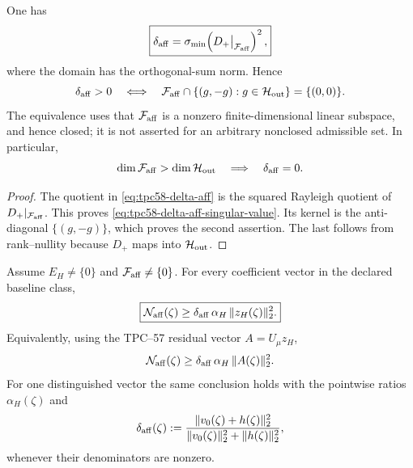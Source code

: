 \begin{proposition}
\label{prop:tpc58-affine-kernel-test}
One has
\begin{equation}
 \boxed{
 \delta_{\rm aff}
 =\sigma_{\min}\!\left(D_+\big|_{\mathcal F_{\rm aff}}\right)^2,}
 \label{eq:tpc58-delta-aff-singular-value}
\end{equation}
where the domain has the orthogonal-sum norm.  Hence
\begin{equation}
 \delta_{\rm aff}>0
 \quad\Longleftrightarrow\quad
 \mathcal F_{\rm aff}\cap
 \{(g,-g):g\in\mathcal H_{\rm out}\}=\{(0,0)\}.
 \label{eq:tpc58-delta-aff-kernel-test}
\end{equation}
The equivalence uses that \(\mathcal F_{\rm aff}\) is a nonzero finite-dimensional
linear subspace, and hence closed; it is not asserted for an arbitrary
nonclosed admissible set.
In particular,
\begin{equation}
 \dim\mathcal F_{\rm aff}>\dim\mathcal H_{\rm out}
 \quad\Longrightarrow\quad
 \delta_{\rm aff}=0.
 \label{eq:tpc58-delta-aff-dimension-test}
\end{equation}
\end{proposition}

\begin{proof}
The quotient in \eqref{eq:tpc58-delta-aff} is the squared Rayleigh
quotient of \(D_+|_{\mathcal F_{\rm aff}}\).  This proves
\eqref{eq:tpc58-delta-aff-singular-value}.  Its kernel is the anti-diagonal
\(\{(g,-g)\}\), which proves the second assertion.  The last follows from
rank--nullity because \(D_+\) maps into \(\mathcal H_{\rm out}\).
\end{proof}

\begin{theorem}
\label{thm:tpc58-two-stage-affine-transfer}
Assume \(E_H\ne\{0\}\) and
\(\mathcal F_{\rm aff}\ne\{0\}\).  For every coefficient vector in the declared
baseline class,
\begin{equation}
 \boxed{
 \mathcal N_{\rm aff}(\zeta)
 \ge
 \delta_{\rm aff}\,\alpha_H\,
 \|z_H(\zeta)\|_2^2.}
 \label{eq:tpc58-two-stage-affine-transfer}
\end{equation}
Equivalently, using the TPC--57 residual vector \(A=U_\mu z_H\),
\begin{equation}
 \mathcal N_{\rm aff}(\zeta)
 \ge
 \delta_{\rm aff}\,\alpha_H\,\|A(\zeta)\|_2^2.
 \label{eq:tpc58-two-stage-tpc57-transfer}
\end{equation}
For one distinguished vector the same conclusion holds with the pointwise
ratios \(\alpha_H(\zeta)\) and
\begin{equation}
 \delta_{\rm aff}(\zeta)
 :=\frac{\|v_0(\zeta)+h(\zeta)\|_2^2}
 {\|v_0(\zeta)\|_2^2+\|h(\zeta)\|_2^2},
 \label{eq:tpc58-distinguished-delta-aff}
\end{equation}
whenever their denominators are nonzero.
\end{theorem}

